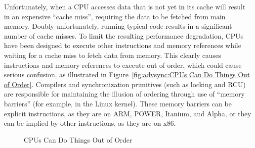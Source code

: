 Unfortunately, when a CPU accesses data that is not yet in its cache
will result in an expensive ``cache miss'', requiring the data to
be fetched from main memory.
Doubly unfortunately, running typical code results in a significant
number of cache misses.
To limit the resulting performance degradation, CPUs have been designed to
execute other instructions and memory references while waiting for
a cache miss to fetch data from memory.
This clearly causes instructions and memory references to execute out
of order, which could cause serious confusion, as illustrated in
Figure~\ref{fig:advsync:CPUs Can Do Things Out of Order}.
Compilers and synchronization primitives (such as locking and RCU)
are responsible for maintaining the illusion of ordering through use of
``memory barriers'' (for example,  in the Linux kernel).
These memory barriers can be explicit instructions, as they are on
ARM, POWER, Itanium, and Alpha, or they can be implied by other instructions,
as they are on x86.

\begin{figure}[htb]
\begin{center}
\end{center}
\caption{CPUs Can Do Things Out of Order}
\end{figure}

